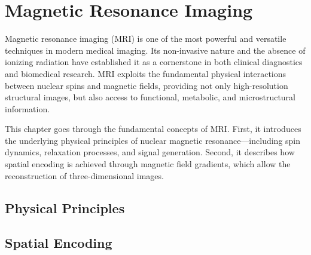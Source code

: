 \chapter{Magnetic Resonance Imaging} \label{chap:MagneticResonanceImaging}
\vspace{1cm}

Magnetic resonance imaging (MRI) is one of the most powerful and versatile techniques in modern medical imaging. Its non-invasive nature and the absence of ionizing radiation have established it as a cornerstone in both clinical diagnostics and biomedical research. MRI exploits the fundamental physical interactions between nuclear spins and magnetic fields, providing not only high-resolution structural images, but also access to functional, metabolic, and microstructural information.

This chapter goes through the fundamental concepts of MRI. First, it introduces the underlying physical principles of nuclear magnetic resonance---including spin dynamics, relaxation processes, and signal generation. Second, it describes how spatial encoding is achieved through magnetic field gradients, which allow the reconstruction of three-dimensional images.

\section{Physical Principles}

\section{Spatial Encoding}
